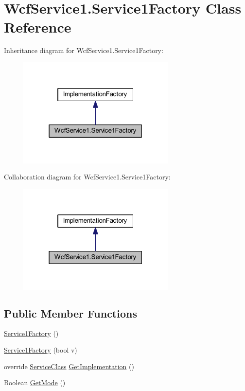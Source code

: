 \hypertarget{class_wcf_service1_1_1_service1_factory}{}\section{Wcf\+Service1.\+Service1\+Factory Class Reference}
\label{class_wcf_service1_1_1_service1_factory}


Inheritance diagram for Wcf\+Service1.\+Service1\+Factory\+:\nopagebreak
\begin{figure}[H]
\begin{center}
\leavevmode
\includegraphics[width=223pt]{class_wcf_service1_1_1_service1_factory__inherit__graph}
\end{center}
\end{figure}


Collaboration diagram for Wcf\+Service1.\+Service1\+Factory\+:\nopagebreak
\begin{figure}[H]
\begin{center}
\leavevmode
\includegraphics[width=223pt]{class_wcf_service1_1_1_service1_factory__coll__graph}
\end{center}
\end{figure}
\subsection*{Public Member Functions}
\begin{DoxyCompactItemize}
\item 
\hyperlink{class_wcf_service1_1_1_service1_factory_a7e56959270e8bda3cd348e86cd8e370d}{Service1\+Factory} ()
\item 
\hyperlink{class_wcf_service1_1_1_service1_factory_a3d585ca9f17bb7a01a96f82bcbf80bd4}{Service1\+Factory} (bool v)
\item 
override \hyperlink{class_wcf_service1_1_1_service_class}{Service\+Class} \hyperlink{class_wcf_service1_1_1_service1_factory_ae1204f90d6f8c4fcd4ad6b95cb6815b7}{Get\+Implementation} ()
\item 
Boolean \hyperlink{class_wcf_service1_1_1_service1_factory_ab93c8e9c9e2a60cfbeb00f3c67e4e364}{Get\+Mode} ()
\end{DoxyCompactItemize}
